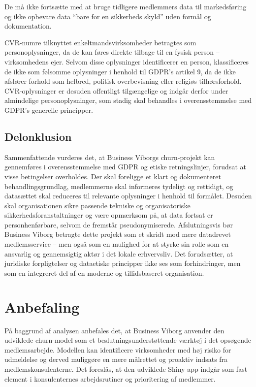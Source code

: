 \documentclass[
  11pt,
  letterpaper,
  DIV=11,
  numbers=noendperiod]{scrartcl}
\begin{document}
De må ikke fortsætte med at bruge tidligere medlemmers data til
markedsføring og ikke opbevare data ``bare for en sikkerheds skyld''
uden formål og dokumentation.

CVR-numre tilknyttet enkeltmandsvirksomheder betragtes som
personoplysninger, da de kan føres direkte tilbage til en fysisk person
-- virksomhedens ejer. Selvom disse oplysninger identificerer en person,
klassificeres de ikke som følsomme oplysninger i henhold til GDPR's
artikel 9, da de ikke afslører forhold som helbred, politisk
overbevisning eller religiøs tilhørsforhold. CVR-oplysninger er desuden
offentligt tilgængelige og indgår derfor under almindelige
personoplysninger, som stadig skal behandles i overensstemmelse med
GDPR's generelle principper.

\subsection{Delonklusion}\label{delonklusion}

Sammenfattende vurderes det, at Business Viborgs churn-projekt kan
gennemføres i overensstemmelse med GDPR og etiske retningslinjer,
forudsat at visse betingelser overholdes. Der skal foreligge et klart og
dokumenteret behandlingsgrundlag, medlemmerne skal informeres tydeligt
og rettidigt, og datasættet skal reduceres til relevante oplysninger i
henhold til formålet. Desuden skal organisationen sikre passende
tekniske og organisatoriske sikkerhedsforanstaltninger og være opmærksom
på, at data fortsat er personhenførbare, selvom de fremstår
pseudonymiserede. Afslutningsvis bør Business Viborg betragte dette
projekt som et skridt mod mere datadrevet medlemsservice -- men også som
en mulighed for at styrke sin rolle som en ansvarlig og gennemsigtig
aktør i det lokale erhvervsliv. Det forudsætter, at juridiske
forpligtelser og dataetiske principper ikke ses som forhindringer, men
som en integreret del af en moderne og tillidsbaseret organisation.

\section{Anbefaling}\label{anbefaling}

På baggrund af analysen anbefales det, at Business Viborg anvender den
udviklede churn-model som et beslutningsunderstøttende værktøj i det
opsøgende medlemsarbejde. Modellen kan identificere virksomheder med høj
risiko for udmeldelse og derved muliggøre en mere målrettet og proaktiv
indsats fra medlemskonsulenterne. Det foreslås, at den udviklede Shiny
app indgår som fast element i konsulenternes arbejdsrutiner og
prioritering af medlemmer.
\end{document}
